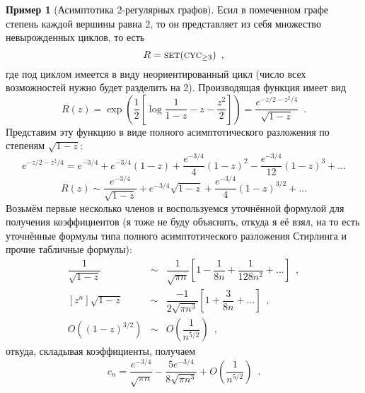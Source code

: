 \documentclass[a5paper]{article}
\theoremstyle{definition}
\newtheorem{example}{Пример}
\def\cyc{\text{\textsc{cyc}}}
\def\set{\text{\textsc{set}}}
\begin{document}
\begin{example}[Асимптотика 2-регулярных графов]
Есил в помеченном графе степень каждой вершины равна \( 2 \), то он
представляет из себя множество невырожденных циклов, то есть
\begin{equation}
    R = \set(\cyc_{\geq 3}) \enspace ,
\end{equation}
где под циклом имеется в виду неориентированный цикл (число всех возможностей
нужно будет разделить на 2). Производящая функция имеет вид
\begin{equation}
    R(z) = \exp\left(
        \dfrac12 \left[
            \log \dfrac{1}{1 - z} - z - \dfrac{z^2}{2}
        \right]
    \right)
    = 
    \dfrac{e^{-z/2 - z^2/4}}{\sqrt{1-z}}
    \enspace .
\end{equation}
Представим эту функцию в виде полного асимптотического разложения по степеням \(
\sqrt{1 - z} \):
\begin{equation}
    e^{-z/2-z^2/4} = e^{-3/4} + e^{-3/4}(1-z) + \dfrac{e^{-3/4}}{4}(1-z)^2 -
\dfrac{e^{-3/4}}{12} (1-z)^3 + \ldots
\end{equation}
\begin{equation}
    R(z) \sim \dfrac{e^{-3/4}}{\sqrt{1-z}} + e^{-3/4} \sqrt{1 - z}
    + \dfrac{e^{-3/4}}{4} (1 - z)^{3/2} + \ldots
\end{equation}
Возьмём первые несколько членов и воспользуемся уточнённой формулой
для получения коэффициентов (я тоже не буду объяснять, откуда я её взял, на то
есть уточнённые формулы типа полного асимптотического разложения Стирлинга и
прочие табличные формулы):
 \begin{eqnarray*}
     [z^n] \dfrac{1}{\sqrt{1-z}}
     &\sim& \dfrac{1}{\sqrt{\pi n}} \left[
         1 - \dfrac{1}{8n} + \dfrac{1}{128n^2} + \ldots
     \right] \enspace ,
\\
     {}[z^n] \sqrt{1-z}
     &\sim& \dfrac{-1}{2\sqrt{\pi n^3}} \left[
         1 + \dfrac{3}{8n} + \ldots
     \right] \enspace ,
\\
     O ( (1-z)^{3/2} )
     &\sim& O \left(
         \dfrac{1}{n^{5/2}}
     \right) 
     \enspace ,
 \end{eqnarray*}       
откуда, складывая коэффициенты, получаем
\begin{equation}
    c_n = \dfrac{e^{-3/4}}{\sqrt{\pi n}} - \dfrac{5 e^{-3/4}}{8 \sqrt{\pi n^3}}
    + O \left(
        \dfrac{1}{n^{5/2}}
    \right)
    \enspace .
\end{equation}
\end{example}
\end{document}
